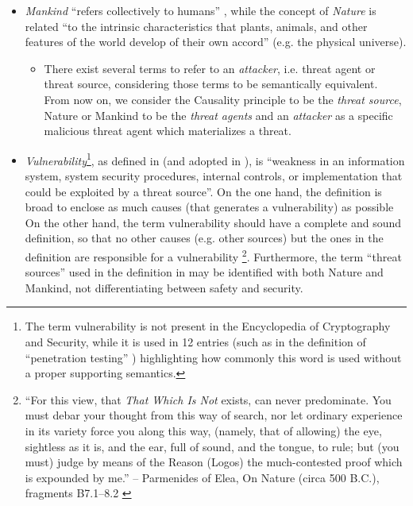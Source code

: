 \documentclass[conference]{IEEEtran}
\begin{document}
\begin{itemize}
	\item \emph{Mankind} ``refers collectively to humans''
\cite{wiki-mankind}, while the concept of \emph{Nature} is
		related ``to the intrinsic characteristics that plants,
		animals, and other features of the world develop of their own
		accord'' (e.g. the physical universe)\cite{wiki-nature}. 
		\begin{itemize}
			\item There exist several terms to refer to an
				\emph{attacker}, i.e. threat agent or threat source,
				considering those terms to be semantically
				equivalent.  From now on, we consider the
				Causality principle to be the \emph{threat
				source}, Nature or Mankind to be the
				\emph{threat agents} and an \emph{attacker} as
				a specific malicious threat agent which materializes a
				threat.
		\end{itemize}
	\item \emph{Vulnerability}\footnote{The term vulnerability is not
		present in the Encyclopedia of Cryptography and Security, while
		it is used in 12 entries (such as in the definition of
		``penetration testing'' \cite{caddy2005pentest})
		highlighting how commonly this word is used without a proper
		supporting semantics.}, as defined in \cite{cnssi20104009}
		(and adopted in \cite{nist2013800-53}), is ``weakness in an
		information system, system security procedures, internal
		controls, or implementation that could be exploited by a threat
		source''. On the one hand, the definition is broad to enclose
		as much causes (that generates a vulnerability) as possible
		On the other hand, the term vulnerability should have a complete and sound
		definition, so that no other causes (e.g.  other sources) but
		the ones in the definition are responsible for a vulnerability
		\footnote{``For this view, that
		\emph{That Which Is Not} exists, can never predominate. You
		must debar your thought from this way of search, nor let
		ordinary experience in its variety force you along this way,
		(namely, that of allowing) the eye, sightless as it is, and the
		ear, full of sound, and the tongue, to rule; but (you must)
		judge by means of the Reason (Logos) the much-contested proof
		which is expounded by me.'' -- Parmenides of Elea, On Nature
		(circa 500 B.C.), fragments B7.1–8.2
		\cite{Hakim2016philosophy}}.
		Furthermore, the term ``threat sources'' used in the definition
		in\cite{cnssi20104009} may be identified with both Nature
		and Mankind, not differentiating between safety and security.
\end{itemize}
\end{document}
